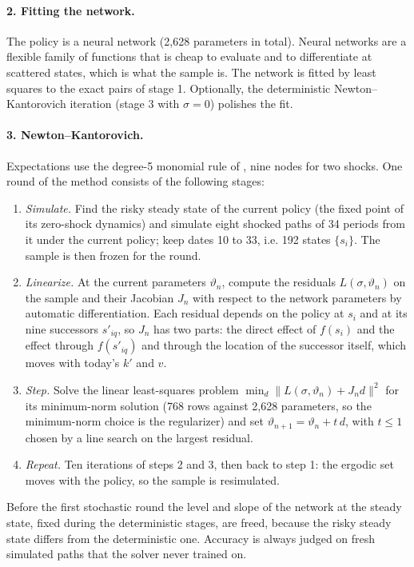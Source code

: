 \documentclass[11pt]{article}
\begin{document}
\paragraph{2. Fitting the network.} The policy is a neural network (2{,}628 parameters in total). Neural networks are a flexible family of functions that is cheap to evaluate and to differentiate at scattered states, which is what the sample is. The network is fitted by least squares to the exact pairs of stage 1. Optionally, the deterministic Newton--Kantorovich iteration (stage 3 with $\sigma = 0$) polishes the fit.

\paragraph{3. Newton--Kantorovich.} Expectations use the degree-5 monomial rule of \citet{judd2011numerically}, nine nodes for two shocks. One round of the method consists of the following stages:
\begin{enumerate}[leftmargin=2em]
\item \emph{Simulate.} Find the risky steady state of the current policy (the fixed point of its zero-shock dynamics) and simulate eight shocked paths of 34 periods from it under the current policy; keep dates 10 to 33, i.e. 192 states $\{s_i\}$. The sample is then frozen for the round.
\item \emph{Linearize.} At the current parameters $\vartheta_n$, compute the residuals $L(\sigma, \vartheta_n)$ on the sample and their Jacobian $J_n$ with respect to the network parameters by automatic differentiation. Each residual depends on the policy at $s_i$ and at its nine successors $s'_{iq}$, so $J_n$ has two parts: the direct effect of $f(s_i)$ and the effect through $f(s'_{iq})$ and through the location of the successor itself, which moves with today's $k'$ and $v$. 
\item \emph{Step.} Solve the linear least-squares problem $\min_d \| L(\sigma, \vartheta_n) + J_n d \|^2$ for its minimum-norm solution (768 rows against 2{,}628 parameters, so the minimum-norm choice is the regularizer) and set $\vartheta_{n+1} = \vartheta_n + t\, d$, with $t \le 1$ chosen by a line search on the largest residual.
\item \emph{Repeat.} Ten iterations of steps 2 and 3, then back to step 1: the ergodic set moves with the policy, so the sample is resimulated. 
\end{enumerate}
Before the first stochastic round the level and slope of the network at the steady state, fixed during the deterministic stages, are freed, because the risky steady state differs from the deterministic one. Accuracy is always judged on fresh simulated paths that the solver never trained on.
\end{document}
